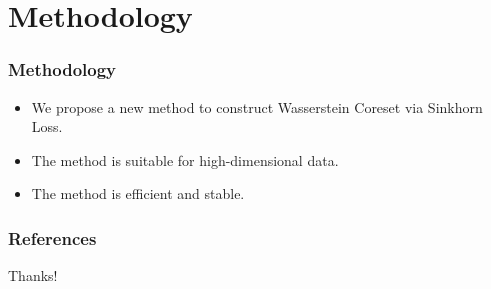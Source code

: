 \documentclass{beamer}
\begin{document}
\section{Methodology}
\begin{frame}[<+->]
\frametitle{Methodology}
\begin{itemize}
    \item We propose a new method to construct Wasserstein Coreset via Sinkhorn Loss.
    \item The method is suitable for high-dimensional data.
    \item The method is efficient and stable.
\end{itemize}
\end{frame}

\begin{frame}[allowframebreaks]
\frametitle{References}
\tiny
\end{frame}

\begin{frame}
    \begin{center}
        {\Huge\calligra Thanks!}
    \end{center}
\end{frame}
\end{document}
